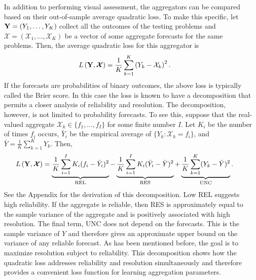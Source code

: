 \documentclass[11pt]{article}
\theoremstyle{definition}
\theoremstyle{definition}
\def\Y{{\bf Y}}
\begin{document}
In addition to performing visual assessment, the aggregators can be compared based on their out-of-sample average quadratic loss. To make this specific, let $\Y = (Y_1, \dots, Y_K)$ collect all the outcomes of the testing problems and $\boldsymbol{\mathcal{X}} = (\mathcal{X}_1, \dots, \mathcal{X}_K)$ be a vector of some aggregate forecasts for the same problems. Then, the average quadratic loss for this aggregator is
\begin{align*}
L\left(\Y, \boldsymbol{\mathcal{X}}\right) &= \frac{1}{K} \sum_{k=1}^K \left(Y_k - \mathcal{X}_k\right)^2.
\end{align*}
If the forecasts are probabilities of binary outcomes, the above loss is typically called the Brier score. In this case the loss is known to have a decomposition that permits a closer analysis of  reliability and resolution. The decomposition, however, is not limited to probability forecasts. To see this, suppose that the real-valued aggregate $\mathcal{X}_k \in \{f_1, \dots, f_I\}$ for some finite number $I$. Let $K_i$ be the number of times $f_i$ occurs, $\bar{Y}_i$ be the empirical average of $\{Y_k : \mathcal{X}_k = f_i\}$, and $\bar{Y} = \frac{1}{K} \sum_{k=1}^K Y_k$. Then,
\begin{align}
L\left(\Y, \boldsymbol{\mathcal{X}} \right)  &= \underbrace{\frac{1}{K} \sum_{i=1}^I K_i(f_i - \bar{Y}_i)^2}_\text{REL} - \underbrace{\frac{1}{K} \sum_{i=1}^I K_i(\bar{Y}_i-\bar{Y})^2}_\text{RES} + \underbrace{\frac{1}{K} \sum_{k=1}^K (Y_k - \bar{Y})^2}_\text{UNC}. \label{decomposition}
\end{align}
See the Appendix for the derivation of this decomposition. Low REL suggests high reliability. If the aggregate is reliable, then RES is approximately equal to the sample variance of the aggregate and 
is positively associated with high resolution. 
The final term, UNC does not depend on the forecasts. This is the sample variance of $Y$ and therefore gives an approximate upper bound on the variance of any reliable forecast. As has been mentioned before, the goal is to maximize resolution subject to reliability. This decomposition shows how the quadratic loss addresses reliability and resolution simultaneously and therefore provides a convenient loss function for learning aggregation parameters. 
\end{document}
